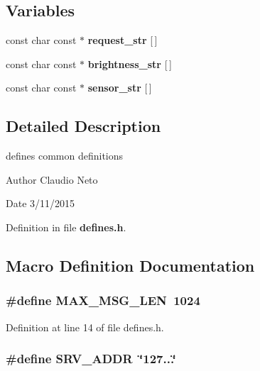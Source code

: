 \subsection*{Variables}
\begin{DoxyCompactItemize}
\item 
const char const $\ast$ {\bf request\-\_\-str} [$\,$]
\item 
const char const $\ast$ {\bf brightness\-\_\-str} [$\,$]
\item 
const char const $\ast$ {\bf sensor\-\_\-str} [$\,$]
\end{DoxyCompactItemize}


\subsection{Detailed Description}
defines common definitions \begin{DoxyAuthor}{Author}
Claudio Neto
\end{DoxyAuthor}
\begin{DoxyDate}{Date}
3/11/2015 
\end{DoxyDate}


Definition in file {\bf defines.\-h}.



\subsection{Macro Definition Documentation}
\subsubsection[{M\-A\-X\-\_\-\-M\-S\-G\-\_\-\-L\-E\-N}]{\setlength{\rightskip}{0pt plus 5cm}\#define M\-A\-X\-\_\-\-M\-S\-G\-\_\-\-L\-E\-N~1024}\label{defines_8h_a51d90ea93d4b55e086cb490f7478e684}


Definition at line 14 of file defines.\-h.

\subsubsection[{S\-R\-V\-\_\-\-A\-D\-D\-R}]{\setlength{\rightskip}{0pt plus 5cm}\#define S\-R\-V\-\_\-\-A\-D\-D\-R~\char`\"{}127...\char`\"{}}\label{defines_8h_ad43b436f38b6543a54dc74559fe7be11}


